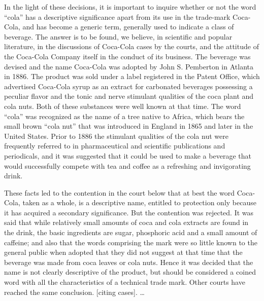 In the light of these decisions, it is important to inquire whether or not the
word ``cola'' has a descriptive significance apart from its use in the
trade-mark Coca-Cola, and has become a generic term, generally used to indicate
a class of beverage. The answer is to be found, we believe, in scientific and
popular literature, in the discussions of Coca-Cola cases by the courts, and
the attitude of the Coca-Cola Company itself in the conduct of its business.
The beverage was devised and the name Coca-Cola was adopted by John S.
Pemberton in Atlanta in 1886. The product was sold under a label registered in
the Patent Office, which advertised Coca-Cola syrup as an extract for
carbonated beverages possessing a peculiar flavor and the tonic and nerve
stimulant qualities of the coca plant and cola nuts. Both of these substances
were well known at that time. The word ``cola'' was recognized as the name of a
tree native to Africa, which bears the small brown ``cola nut'' that was
introduced in England in 1865 and later in the United States. Prior to 1886 the
stimulant qualities of the cola nut were frequently referred to in
pharmaceutical and scientific publications and periodicals, and it was
suggested that it could be used to make a beverage that would successfully
compete with tea and coffee as a refreshing and invigorating drink.

These facts led to the contention in the court below that at best the word
Coca-Cola, taken as a whole, is a descriptive name, entitled to protection only
because it has acquired a secondary significance. But the contention was
rejected. It was said that while relatively small amounts of coca and cola
extracts are found in the drink, the basic ingredients are sugar, phosphoric
acid and a small amount of caffeine; and also that the words comprising the
mark were so little known to the general public when adopted that they did not
suggest at that time that the beverage was made from coca leaves or cola nuts.
Hence it was decided that the name is not clearly descriptive of the product,
but should be considered a coined word with all the characteristics of a
technical trade mark. Other courts have reached the same conclusion. [citing
cases]. {\dots}

